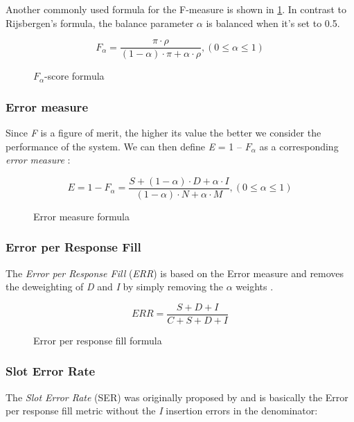 Another commonly used formula for the F-measure is shown in \ref{fig:falpha-score}. In contrast to Rijsbergen's formula, the balance parameter $\alpha$ is balanced when it's set to 0.5.

\begin{figure}[H]
\begin{displaymath}
	F_\alpha = \frac{\pi \cdot \rho}{(1-\alpha) \cdot \pi + \alpha \cdot \rho}, (0 \le \alpha \le 1)
\end{displaymath}
\caption{$\textit{F}_\alpha$-score formula \cite{Makhoul:1999}}
\label{fig:falpha-score}
\end{figure}

\subsubsection{Error measure}
Since \textit{F} is a figure of merit, the higher its value the better we consider the performance of the system. We can then define \textit{E} = 1 – $F_\alpha$ as a corresponding \textit{error measure} \cite{Makhoul:1999}:

\begin{figure}[H]
\begin{displaymath}
	E = 1 - F_\alpha = \frac{S + (1-\alpha) \cdot D + \alpha \cdot I}{(1-\alpha) \cdot N + \alpha \cdot M}, (0 \le \alpha \le 1)
\end{displaymath}
\caption{Error measure formula}
\label{eq:error-measure}
\end{figure}

\subsubsection{Error per Response Fill}
The \textit{Error per Response Fill} (\textit{ERR}) is based on the Error measure and removes the deweighting of \textit{D} and \textit{I} by simply removing the $\alpha$ weights \cite{Chinchor:1995}\cite{Makhoul:1999}.

\begin{figure}[H]
\begin{displaymath}
	ERR = \frac{S+D+I}{C+S+D+I}
\end{displaymath}
\caption{Error per response fill formula}
\label{eq:error-per-response-fill}
\end{figure}

\subsubsection{Slot Error Rate}
The \textit{Slot Error Rate} (SER) was originally proposed by \citeauthor{Makhoul:1999} \cite{Makhoul:1999} and is basically the Error per response fill metric without the \textit{I} insertion errors in the denominator:

